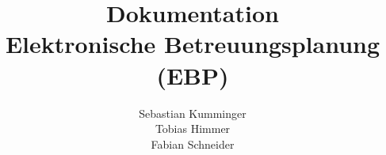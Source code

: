 \documentclass[a4paper,12pt]{article}
\title{Dokumentation\\Elektronische Betreuungsplanung\\(EBP)}
\author{Sebastian Kumminger \\
	Tobias Himmer \\
	Fabian Schneider}
\begin{document}
\maketitle

\newpage

\tableofcontents

\newpage

\listoffigures


\newpage



\newpage



\newpage



\newpage



\newpage
\begin{appendix} 


 



\end{appendix}
\end{document}
